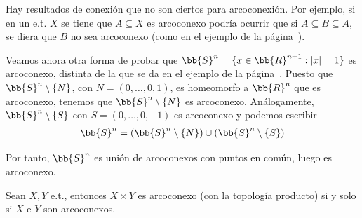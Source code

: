 \begin{observacion}
    Hay resultados de conexión que no son ciertos para arcoconexión. Por ejemplo, si en un e.t. $X$ se tiene que $A\subseteq X$ es arcoconexo podría ocurrir que si $A\subseteq B \subseteq \overline{A}$, se diera que $B$ no sea arcoconexo (como en el ejemplo de la página~\pageref{ej:conexo_no_arcoconexo}).
\end{observacion}

\begin{ejemplo}\label{ej:arcos_s2_2}
    Veamos ahora otra forma de probar que $\bb{S}^n = \{x\in \bb{R}^{n+1} : |x| = 1\}$ es arcoconexo, distinta de la que se da en el ejemplo de la página~\pageref{ej:arcos_s2}. Puesto que $\bb{S}^n\setminus \{N\}$, con $N=(0,\dots,0,1)$, es homeomorfo a $\bb{R}^n$ que es arcoconexo, tenemos que $\bb{S}^n \setminus\{N\}$ es arcoconexo. Análogamente, $\bb{S}^n \setminus\{S\}$ con $S=(0,\dots,0,-1)$ es arcoconexo y podemos escribir
    \begin{gather*}
        \bb{S}^n = (\bb{S}^n \setminus\{N\}) \cup (\bb{S}^n \setminus\{S\})
    \end{gather*}
    
    Por tanto, $\bb{S}^n$ es unión de arcoconexos con puntos en común, luego es arcoconexo.
\end{ejemplo}

\begin{teo}
    Sean $X,Y$ e.t., entonces $X\times Y$ es arcoconexo (con la topología producto) si y solo si $X$ e $Y$ son arcoconexos.
\end{teo}

